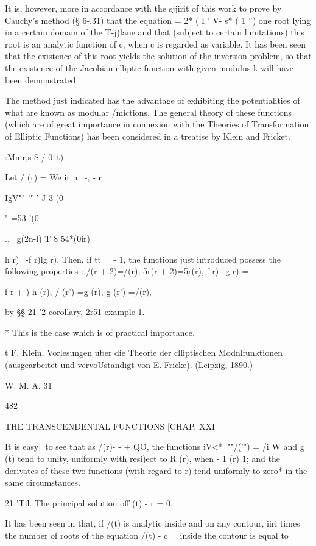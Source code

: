 It is, however, more in accordance with the sjjirit of this work to
prove by Cauchy's method (§ 6-.31) that the equation = 2* ( I ' V- s*
( 1 '') one root lying in a certain domain of the T-j)lane and that
(subject to certain limitations) this root is an analytic function of
c, when c is regarded as variable. It has been seen that the existence
of this root yields the solution of the inversion problem, so that the
existence of the Jacobian elliptic function with given modulus k will
have been demonstrated.

The method just indicated has the advantage of exhibiting the
potentialities of what are known as modular /mictions. The general
theory of these functions (which are of great importance in connexion
with the Theories of Transformation of Elliptic Functions) has been
considered in a treatise by Klein and Fricket.

:Mnir,s S./ 0\ t)

Let / (r) = We ir n \ -, - r \

IgV"" '" ' J 3 (0

" =53-'(0

.. \ g(2n-l) T 8 54*(0ir)

h r)=-f r)lg r). Then, if tt = - 1, the functions just introduced
possess the following properties : /(r + 2)=/(r), 5r(r + 2)=5r(r), f
r)+g r) = \,

f r + ) h (r), / (r') =g (r), g (r') =/(r),

by §§ 21 '2 corollary, 2r51 example 1.

* This is the case which is of practical importance.

t F. Klein, Vorlesungen uber die Theorie der clliptischen
Modnlfunktionen (ausgearbeitet und vervoUstandigt von E. Fricke).
(Leipzig, 1890.)

W. M. A. 31

482

THE TRANSCENDENTAL FUNCTIONS [CHAP. XXI

It is easy|\ to see that as /(r)- - + QO, the functions iV<*~""/('")
= /i W and g (t) tend to unity, uniformly with resi)ect to R (r), when
- 1 (r) 1; and the derivates of these two functions (with regard to
r) tend uniformly to zero* in the same circumstances.

21 'Til. The principal solution off (t) - r = 0.

It has been seen in that, if /(t) is analytic inside and on any
contour, iiri times the number of roots of the equation /(t) - c =
inside the contour is equal to

